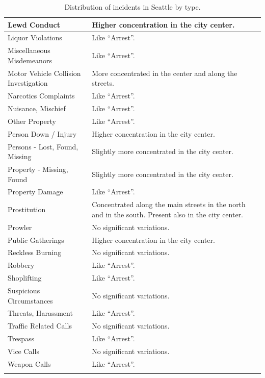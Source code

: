\begin{longtable}{ | >{\arraybackslash} m{3.8cm} | >{\arraybackslash} m{11.2cm} | }
    \hline
    Lewd Conduct            &   Higher concentration in the city center. \\
    \hline
    Liquor Violations       &   Like ``Arrest''. \\
    \hline
    Miscellaneous Misdemeanors &   Like ``Arrest''. \\
    \hline
    Motor Vehicle Collision Investigation &   More concentrated in the center and along the streets. \\
    \hline
    Narcotics Complaints    &   Like ``Arrest''. \\
    \hline
    Nuisance, Mischief      &   Like ``Arrest''. \\
    \hline
    Other Property          &   Like ``Arrest''. \\
    \hline
    Person Down / Injury    &   Higher concentration in the city center. \\
    \hline
    Persons - Lost, Found, Missing &   Slightly more concentrated in the city center. \\
    \hline
    Property - Missing, Found    &   Slightly more concentrated in the city center. \\
    \hline
    Property Damage         &   Like ``Arrest''. \\
    \hline
    Prostitution            &   Concentrated along the main streets in the north and in the south. Present also in the city center. \\
    \hline
    Prowler                 &   No significant variations. \\
    \hline
    Public Gatherings       &   Higher concentration in the city center. \\
    \hline
    Reckless Burning        &   No significant variations. \\
    \hline
    Robbery                 &   Like ``Arrest''. \\
    \hline
    Shoplifting             &   Like ``Arrest''. \\
    \hline
    Suspicious Circumstances &   No significant variations. \\
    \hline
    Threats, Harassment     &   Like ``Arrest''. \\
    \hline
    Traffic Related Calls   &   No significant variations. \\
    \hline
    Trespass                &   Like ``Arrest''. \\
    \hline
    Vice Calls              &   No significant variations. \\
    \hline
    Weapon Calls            &   Like ``Arrest''. \\
    \hline

    \caption{Distribution of incidents in Seattle by type.}
    \label{tab:distribution_by_type}
\end{longtable}
